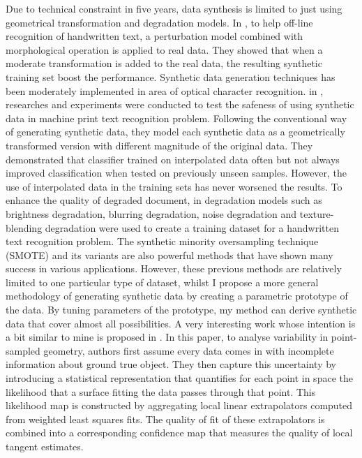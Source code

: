 \documentclass{iitthesis}
\begin{document}
Due to technical constraint in five years, data synthesis is limited to just using geometrical transformation and degradation models. In \cite{VT:03}\cite{VT:04}, to help off-line recognition of handwritten text, a perturbation model combined with morphological operation is applied to real data. They showed that when a moderate transformation is added to the real data, the resulting synthetic training set boost the performance. Synthetic data generation techniques has been moderately implemented in area of optical character recognition. in \cite{NJ:09}, researches and experiments were conducted to test the safeness of using synthetic data in machine print text recognition problem. Following the conventional way of generating synthetic data, they model each synthetic data as a geometrically transformed version with different magnitude of the original data. They demonstrated that classifier trained on interpolated data often but not always improved classification when tested on previously unseen samples. However, the use of interpolated data in the training sets has never worsened the results. To enhance the quality of degraded document, in \cite{BG:08} degradation models such as brightness degradation, blurring degradation, noise degradation and texture-blending degradation were used to create a training dataset for a handwritten text recognition problem. The synthetic minority oversampling technique (SMOTE) \cite{CNV:02} and its variants \cite{HH:05}\cite{HH:08} are also powerful methods that have shown many success in various applications.  However, these previous methods are relatively limited to one particular type of dataset, whilst  I propose a more general  methodology of generating synthetic data by creating a parametric prototype of the data. By tuning parameters of the prototype, my method can derive synthetic data that cover almost all possibilities. A very interesting work whose intention is a bit similar to mine is proposed in \cite{Pauly:2004:UVP:2386332.2386346}. In this paper, to analyse variability in point-sampled geometry, authors first assume every data comes in with incomplete information about ground true object. They then capture this uncertainty by introducing a statistical representation that quantifies for each point in space the likelihood that a surface fitting the data passes through that point. This likelihood map is constructed by aggregating local linear extrapolators computed from weighted least squares fits. The quality of fit of these extrapolators is combined into a corresponding confidence map that measures the quality of local tangent estimates.
\end{document}
